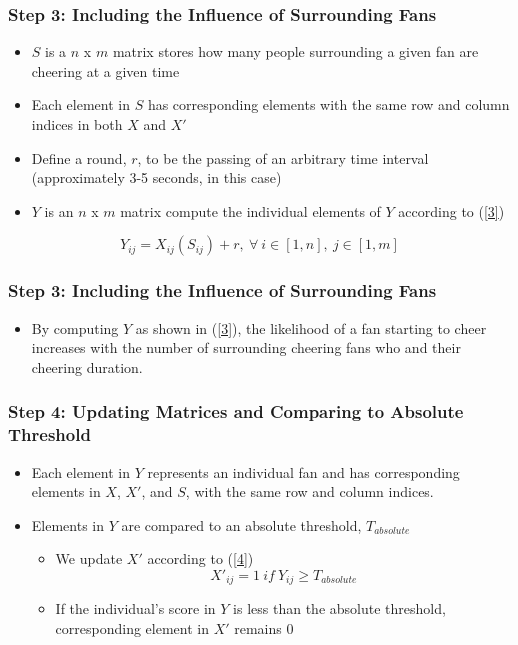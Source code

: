 \documentclass[compress,handout,10pt]{beamer}
\let\olditem\item
\renewcommand{\item}{\setlength{\itemsep}{0.5\baselineskip}\olditem}
\begin{document}
\begin{frame}
\frametitle{Step 3: Including the Influence of Surrounding Fans}
\begin{itemize}
\item $S$ is a $n$ x $m$ matrix stores how many people surrounding a given fan are cheering at a given time
\item Each element in $S$ has corresponding elements with the same row and column indices in both $X$ and $X'$
\item Define a round, $r$, to be the passing of an arbitrary time interval (approximately 3-5 seconds, in this case) 
\item $Y$ is an $n$ x $m$ matrix compute the individual elements of $Y$ according to (\ref{3})
\end{itemize}
\begin{equation}
Y_{ij}=X_{ij}(S_{ij})+r,~\forall~i\in[1,n],~j\in[1,m]
\label{3}
\end{equation}
\end{frame}

\begin{frame}
	\frametitle{Step 3: Including the Influence of Surrounding Fans}
		\begin{itemize}
		\item By computing $Y$ as shown in (\ref{3}), the likelihood of a fan starting to cheer increases with the number of surrounding cheering fans who and their cheering duration.
		\end {itemize}
\end{frame}	 

\begin{frame}
\frametitle{Step 4: Updating Matrices and Comparing to Absolute Threshold}
\begin{itemize}
\item Each element in $Y$ represents an individual fan and has corresponding elements in $X$, $X'$, and $S$, with the same row and column indices. 
\item Elements in $Y$  are compared to an absolute threshold, $T_{absolute}$ \newline
	\begin{itemize} 
		\item We update $X'$ according to (\ref{4})
		\begin{equation}
			X'_{ij}=1~if~Y_{ij}\geq T_{absolute}
			\label{4}
		\end{equation}
		\item If the individual's score in $Y$ is less than the absolute threshold, corresponding element in $X'$ remains 0  
\end{itemize}
\end{itemize}
\end{frame}
\end{document}
